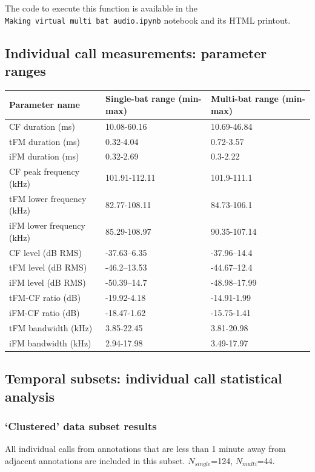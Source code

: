 \documentclass[
]{book}
\begin{document}
The code to execute this function is available in the \texttt{Making\ virtual\ multi\ bat\ audio.ipynb} notebook and its HTML printout.

\hypertarget{indcallparamranges}{%
\subsection{Individual call measurements: parameter ranges}\label{indcallparamranges}}

\begin{longtable}[]{@{}lll@{}}
\toprule
Parameter name & Single-bat range (min-max) & Multi-bat range (min-max)\tabularnewline
\midrule
\endhead
CF duration (ms) & 10.08-60.16 & 10.69-46.84\tabularnewline
tFM duration (ms) & 0.32-4.04 & 0.72-3.57\tabularnewline
iFM duration (ms) & 0.32-2.69 & 0.3-2.22\tabularnewline
CF peak frequency (kHz) & 101.91-112.11 & 101.9-111.1\tabularnewline
tFM lower frequency (kHz) & 82.77-108.11 & 84.73-106.1\tabularnewline
iFM lower frequency (kHz) & 85.29-108.97 & 90.35-107.14\tabularnewline
CF level (dB RMS) & -37.63--6.35 & -37.96--14.4\tabularnewline
tFM level (dB RMS) & -46.2--13.53 & -44.67--12.4\tabularnewline
iFM level (dB RMS) & -50.39--14.7 & -48.98--17.99\tabularnewline
tFM-CF ratio (dB) & -19.92-4.18 & -14.91-1.99\tabularnewline
iFM-CF ratio (dB) & -18.47-1.62 & -15.75-1.41\tabularnewline
tFM bandwidth (kHz) & 3.85-22.45 & 3.81-20.98\tabularnewline
iFM bandwidth (kHz) & 2.94-17.98 & 3.49-17.97\tabularnewline
\bottomrule
\end{longtable}

\hypertarget{subsetsindcall}{%
\subsection{Temporal subsets: individual call statistical analysis}\label{subsetsindcall}}

\hypertarget{clustered-data-subset-results}{%
\subsubsection{`Clustered' data subset results}\label{clustered-data-subset-results}}

All individual calls from annotations that are less than 1 minute away from adjacent annotations are included in this subset. \(N_{single}\)=124, \(N_{multi}\)=44.
\end{document}
